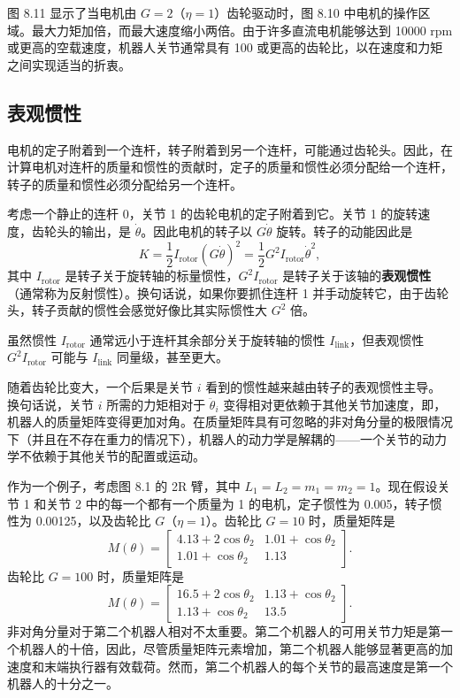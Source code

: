 \documentclass[12pt,a4paper]{article}
\begin{document}
图 8.11 显示了当电机由 $G = 2$（$\eta = 1$）齿轮驱动时，图 8.10 中电机的操作区域。最大力矩加倍，而最大速度缩小两倍。由于许多直流电机能够达到 10000 rpm 或更高的空载速度，机器人关节通常具有 100 或更高的齿轮比，以在速度和力矩之间实现适当的折衷。

\subsection{表观惯性}
电机的定子附着到一个连杆，转子附着到另一个连杆，可能通过齿轮头。因此，在计算电机对连杆的质量和惯性的贡献时，定子的质量和惯性必须分配给一个连杆，转子的质量和惯性必须分配给另一个连杆。

考虑一个静止的连杆 0，关节 1 的齿轮电机的定子附着到它。关节 1 的旋转速度，齿轮头的输出，是 $\dot{\theta}$。因此电机的转子以 $G\dot{\theta}$ 旋转。转子的动能因此是
\begin{equation}
K = \frac{1}{2}I_{\text{rotor}}(G\dot{\theta})^2 = \frac{1}{2}G^2 I_{\text{rotor}}\dot{\theta}^2,
\end{equation}
其中 $I_{\text{rotor}}$ 是转子关于旋转轴的标量惯性，$G^2 I_{\text{rotor}}$ 是转子关于该轴的\textbf{表观惯性}（通常称为反射惯性）。换句话说，如果你要抓住连杆 1 并手动旋转它，由于齿轮头，转子贡献的惯性会感觉好像比其实际惯性大 $G^2$ 倍。

虽然惯性 $I_{\text{rotor}}$ 通常远小于连杆其余部分关于旋转轴的惯性 $I_{\text{link}}$，但表观惯性 $G^2 I_{\text{rotor}}$ 可能与 $I_{\text{link}}$ 同量级，甚至更大。

随着齿轮比变大，一个后果是关节 $i$ 看到的惯性越来越由转子的表观惯性主导。换句话说，关节 $i$ 所需的力矩相对于 $\ddot{\theta}_i$ 变得相对更依赖于其他关节加速度，即，机器人的质量矩阵变得更加对角。在质量矩阵具有可忽略的非对角分量的极限情况下（并且在不存在重力的情况下），机器人的动力学是解耦的——一个关节的动力学不依赖于其他关节的配置或运动。

作为一个例子，考虑图 8.1 的 2R 臂，其中 $L_1 = L_2 = m_1 = m_2 = 1$。现在假设关节 1 和关节 2 中的每一个都有一个质量为 1 的电机，定子惯性为 0.005，转子惯性为 0.00125，以及齿轮比 $G$（$\eta = 1$）。齿轮比 $G = 10$ 时，质量矩阵是
\begin{equation}
M(\theta) = \begin{bmatrix}
4.13 + 2\cos\theta_2 & 1.01 + \cos\theta_2 \\
1.01 + \cos\theta_2 & 1.13
\end{bmatrix}.
\end{equation}
齿轮比 $G = 100$ 时，质量矩阵是
\begin{equation}
M(\theta) = \begin{bmatrix}
16.5 + 2\cos\theta_2 & 1.13 + \cos\theta_2 \\
1.13 + \cos\theta_2 & 13.5
\end{bmatrix}.
\end{equation}
非对角分量对于第二个机器人相对不太重要。第二个机器人的可用关节力矩是第一个机器人的十倍，因此，尽管质量矩阵元素增加，第二个机器人能够显著更高的加速度和末端执行器有效载荷。然而，第二个机器人的每个关节的最高速度是第一个机器人的十分之一。
\end{document}
